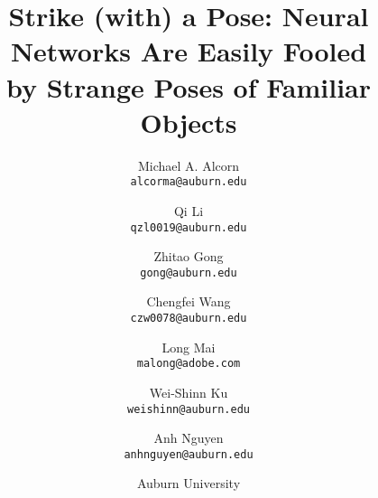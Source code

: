 \documentclass[10pt,twocolumn,letterpaper]{article}
\begin{document}
\newcommand{\papertitle}{Strike (with) a Pose: Neural Networks Are Easily Fooled \\by Strange Poses of Familiar Objects}
\title{\papertitle}


\author{Michael A. Alcorn\\
{\tt\small alcorma@auburn.edu}
\and
Qi Li\\
{\tt\small qzl0019@auburn.edu}
\and
Zhitao Gong\\
{\tt\small gong@auburn.edu}
\and
Chengfei Wang\\
{\tt\small czw0078@auburn.edu}
\and
Long Mai\\
{\tt\small malong@adobe.com}
\and
Wei-Shinn Ku\\
{\tt\small weishinn@auburn.edu}
\and
Anh Nguyen\\
{\tt\small anhnguyen@auburn.edu}
\and
{Auburn University}\hspace{1cm}{Adobe Inc.~~~~~~~}
}

\maketitle
\end{document}
